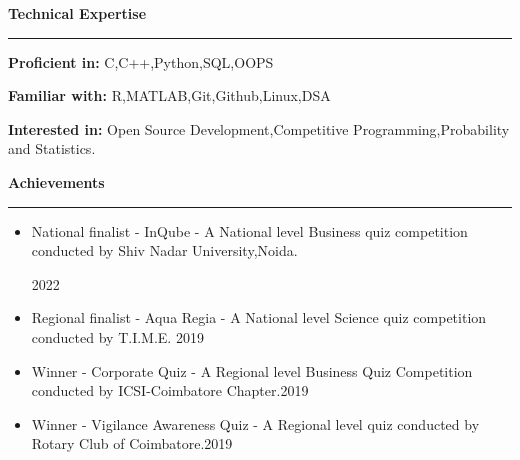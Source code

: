 \documentclass{article}
\begin{document}
\vspace*{.4cm}
\fontsize{15}{14}
\faCubes\vspace*{0.1cm}\textbf{\Large{Technical Expertise}}\par
\rule{\linewidth}{0.5pt}
\fontsize{10}{14}
\vspace*{0.25cm}\par\textbf{Proficient in: }C,C++,Python,SQL,OOPS
\vspace*{0.25cm}\par\textbf{Familiar with: }R,MATLAB,Git,Github,Linux,DSA
\vspace*{0.25cm}\par\textbf{Interested in: }Open Source Development,Competitive Programming,Probability and Statistics.


\vspace*{1cm}
\fontsize{15}{14}
\faCertificate\vspace*{0.1cm}\textbf{\Large{Achievements}}\par
\rule{\linewidth}{0.5pt}
\fontsize{10}{14}
\begin{itemize}
    \item National finalist - InQube - A National level Business quiz competition conducted by Shiv Nadar University,Noida. \par\hfill\fontsize{8}{14}2022
    \item Regional finalist - Aqua Regia - A National level Science quiz competition conducted by T.I.M.E. \hfill\fontsize{8}{14}2019
    \item Winner - Corporate Quiz - A Regional level Business Quiz Competition conducted by ICSI-Coimbatore Chapter.\hfill\fontsize{8}{14}2019
    \item Winner - Vigilance Awareness Quiz - A Regional level quiz conducted by Rotary Club of Coimbatore.\hfill\fontsize{8}{14}2019
\end{itemize}
\end{document}

